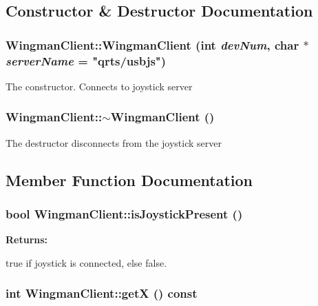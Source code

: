 \subsection{Constructor \& Destructor Documentation}
\hypertarget{class_WingmanClient_a0}{
\subsubsection[WingmanClient]{\setlength{\rightskip}{0pt plus 5cm}Wingman\-Client::Wingman\-Client (int {\em dev\-Num}, char $\ast$ {\em server\-Name} = "qrts/usbjs")}}
\label{class_WingmanClient_a0}


The constructor. Connects to joystick server \hypertarget{class_WingmanClient_a1}{
\subsubsection[~WingmanClient]{\setlength{\rightskip}{0pt plus 5cm}Wingman\-Client::$\sim$Wingman\-Client ()}}
\label{class_WingmanClient_a1}


The destructor disconnects from the joystick server 

\subsection{Member Function Documentation}
\hypertarget{class_WingmanClient_a2}{
\subsubsection[isJoystickPresent]{\setlength{\rightskip}{0pt plus 5cm}bool Wingman\-Client::is\-Joystick\-Present ()}}
\label{class_WingmanClient_a2}


\begin{Desc}
\item[{\bf Returns: }]\par
 true if joystick is connected, else false. \end{Desc}
\hypertarget{class_WingmanClient_a3}{
\subsubsection[getX]{\setlength{\rightskip}{0pt plus 5cm}int Wingman\-Client::get\-X () const}}
\label{class_WingmanClient_a3}


